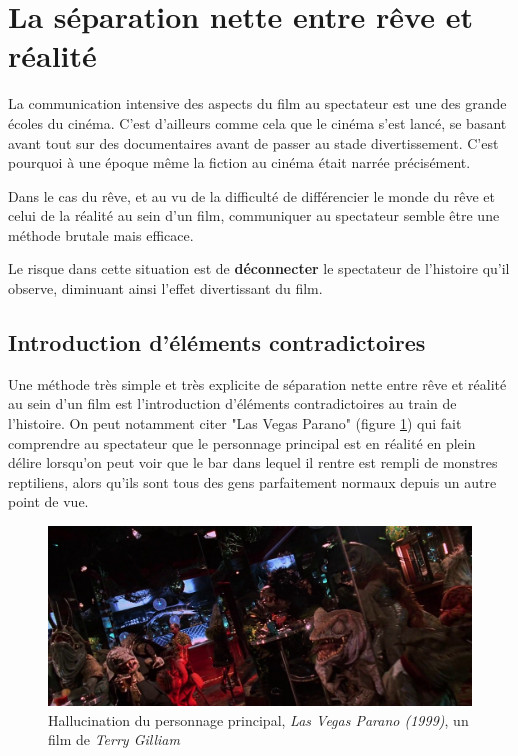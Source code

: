 \documentclass[../main.tex]{subfile}
\begin{document}
\section{La séparation nette entre rêve et réalité}

La communication intensive des aspects du film au spectateur est une des grande
écoles du cinéma. C'est d'ailleurs comme cela que le cinéma s'est lancé, se
basant avant tout sur des documentaires avant de passer au stade
divertissement. C'est pourquoi à une époque même la fiction au cinéma était
narrée précisément.

Dans le cas du rêve, et au vu de la difficulté de différencier le monde du rêve
et celui de la réalité au sein d'un film, communiquer au spectateur semble être
une méthode brutale mais efficace.

Le risque dans cette situation est de \textbf{déconnecter} le spectateur de
l'histoire qu'il observe, diminuant ainsi l'effet divertissant du film.

\subsection{Introduction d'éléments contradictoires}

Une méthode très simple et très explicite de séparation nette entre rêve et
réalité au sein d'un film est l'introduction d'éléments contradictoires au
train de l'histoire. On peut notamment citer "Las Vegas Parano" (figure
\ref{fig:images_lasvegas}) qui fait comprendre au spectateur que le personnage
principal est en réalité en plein délire lorsqu'on peut voir que le bar dans
lequel il rentre est rempli de monstres reptiliens, alors qu'ils sont tous des
gens parfaitement normaux depuis un autre point de vue.

\begin{figure}
    \centering
    \includegraphics[width=\linewidth]{images/lasvegas}
    \caption{Hallucination du personnage principal, \textit{Las Vegas Parano (1999)}, un film de
             \textit{Terry Gilliam}}
    \label{fig:images_lasvegas}
\end{figure}
\end{document}
